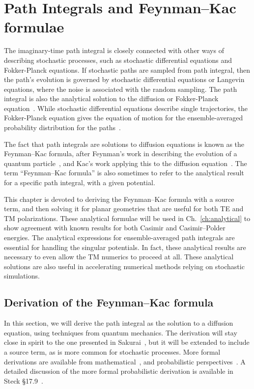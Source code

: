 \chapter{Path Integrals and Feynman--Kac formulae}

\label{ch:feynman_kac}

The imaginary-time path integral is closely connected with other ways of describing stochastic processes, 
such as stochastic differential equations and Fokker-Planck equations.
If stochastic paths are sampled from path integral, then the path's evolution is governed by stochastic
differential equations or Langevin equations, where the noise is associated with the random sampling.
The path integral is also the analytical solution to the diffusion or Fokker-Planck equation~\cite{Karatzas1991, Durrett1996}.
While stochastic differential equations describe single trajectories, the Fokker-Planck equation gives
the equation of motion for the ensemble-averaged probability distribution for the paths~\cite{Gardiner2009}.

The fact that path integrals are solutions to diffusion equations is known as the Feynman--Kac formula,
after Feynman's work in describing the evolution of a quantum particle~\cite{Feynman1948},  and Kac's
work applying this to the diffusion equation~\cite{Kac1949}.
The term ``Feynman--Kac formula'' is also sometimes to refer to the analytical result for a specific path integral,
with a given potential.  

This chapter is devoted to deriving the Feynman--Kac formula with a source term, and then solving
it for planar geometries that are useful for both TE and TM polarizations.
These analytical formulae will be used in Ch.~\ref{ch:analytical} to show agreement 
with known results for both Casimir and Casimir--Polder energies.
The analytical expressions for ensemble-averaged path integrals are essential for handling the singular potentials.  
In fact, these analytical results are necessary to even allow the TM numerics to proceed at all.
These analytical solutions are also useful in accelerating numerical methods relying 
on stochastic simulations.  

\section{Derivation of the Feynman--Kac formula }

In this section, we will derive the path integral as the solution to a diffusion equation,
using techniques from quantum mechanics.
The derivation will stay close in spirit to the one presented in Sakurai~\cite{Sakurai1994}, but it will
be extended to include a source term, as is more common for stochastic processes.
More formal derivations are available from mathematical~\cite{Cartier2004},
and probabilistic perspectives~\cite{Karatzas1991, Durrett1996}.  
A detailed discussion of the more formal probabilistic derivation is available in Steck \S 17.9~\cite{SteckNotes}.

